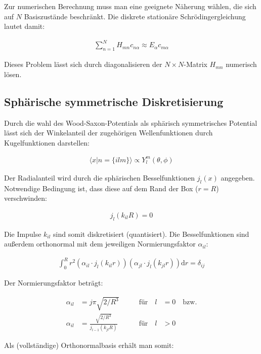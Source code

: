 Zur numerischen Berechnung muss man eine geeignete Näherung wählen,
die sich auf $N$ Basiszustände beschränkt. Die diskrete stationäre
Schrödingergleichung lautet damit:

\begin{align}
  \sum_{n=1}^N H_{m n} c_{n \alpha} \approx E_\alpha c_{m \alpha}
\end{align}

Dieses Problem lässt sich durch diagonalisieren der $N \times
N$-Matrix $H_{m n}$ numerisch lösen.

\subsection{Sphärische symmetrische Diskretisierung}
\label{sec:sphaerisch}

Durch die wahl des Wood-Saxon-Potentials als sphärisch symmetrisches
Potential lässt sich der Winkelanteil der zugehörigen Wellenfunktionen
durch Kugelfunktionen darstellen:

\begin{align}
  \langle x | n = \{ i l m \} \rangle \propto Y_l^m(\theta, \phi)
\end{align}

Der Radialanteil wird durch die sphärischen Besselfunktionen $j_l(x)$
angegeben. Notwendige Bedingung ist, dass diese auf dem Rand der Box
($r = R$) verschwinden:

\begin{align}
  j_l(k_{il} R) = 0
\end{align}

Die Impulse $k_{il}$ sind somit diskretisiert (quantisiert). Die
Besselfunktionen sind außerdem orthonormal mit dem jeweiligen
Normierungsfaktor $\alpha_{il}$:

\begin{align}
  \int_0^R r^2 (\alpha_{il} \cdot j_l(k_{il} r)) (\alpha_{jl} \cdot
  j_l(k_{jl} r)) \text{d} r = \delta_{ij}
\end{align}

Der Normierungsfaktor beträgt:

\begin{align}
  \alpha_{il} &= j \pi \sqrt{2 / R^3} \qquad &\text{für} \quad l &= 0
  \quad \text{bzw.}\\
  \alpha_{il} &= \frac{ \sqrt{2 / R^3} }{j_{l-1}(k_{jl}R)} \qquad &\text{für} \quad l &> 0
\end{align}

Als (vollständige) Orthonormalbasis erhält man somit:

